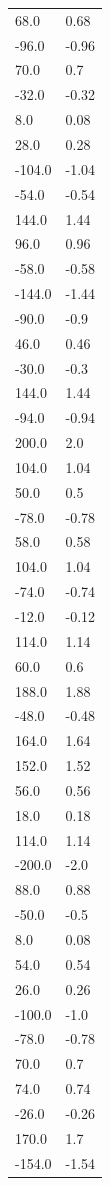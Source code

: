\begin{longtable}{ll}
68.0 & 0.68 \\
-96.0 & -0.96 \\
70.0 & 0.7 \\
-32.0 & -0.32 \\
8.0 & 0.08 \\
28.0 & 0.28 \\
-104.0 & -1.04 \\
-54.0 & -0.54 \\
144.0 & 1.44 \\
96.0 & 0.96 \\
-58.0 & -0.58 \\
-144.0 & -1.44 \\
-90.0 & -0.9 \\
46.0 & 0.46 \\
-30.0 & -0.3 \\
144.0 & 1.44 \\
-94.0 & -0.94 \\
200.0 & 2.0 \\
104.0 & 1.04 \\
50.0 & 0.5 \\
-78.0 & -0.78 \\
58.0 & 0.58 \\
104.0 & 1.04 \\
-74.0 & -0.74 \\
-12.0 & -0.12 \\
114.0 & 1.14 \\
60.0 & 0.6 \\
188.0 & 1.88 \\
-48.0 & -0.48 \\
164.0 & 1.64 \\
152.0 & 1.52 \\
56.0 & 0.56 \\
18.0 & 0.18 \\
114.0 & 1.14 \\
-200.0 & -2.0 \\
88.0 & 0.88 \\
-50.0 & -0.5 \\
8.0 & 0.08 \\
54.0 & 0.54 \\
26.0 & 0.26 \\
-100.0 & -1.0 \\
-78.0 & -0.78 \\
70.0 & 0.7 \\
74.0 & 0.74 \\
-26.0 & -0.26 \\
170.0 & 1.7 \\
-154.0 & -1.54 \\

\end{longtable}
